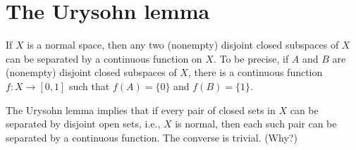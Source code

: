 \section{The Urysohn lemma}
\begin{thm}\label{Urysohn lemma}
    If $X$ is a normal space, then any two (nonempty) disjoint closed subspaces of $X$ can be separated by a continuous function on $X$.
    To be precise, if $A$ and $B$ are (nonempty) disjoint closed subspaces of $X$, there is a continuous function $f: X\rightarrow[0, 1]$ such that $f(A)=\{0\}$ and $f(B)=\{1\}$.
\end{thm}
\begin{rmk}
    The Urysohn lemma implies that if every pair of closed sets in $X$ can be separated by disjoint open sets, i.e., $X$ is normal, then each such pair can be separated by a continuous function.
    The converse is trivial. (Why?)
\end{rmk}
